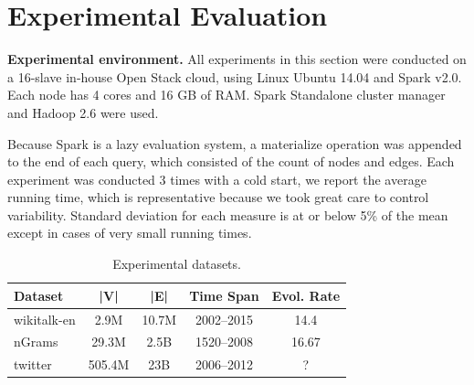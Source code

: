 \section{Experimental Evaluation}
\label{sec:exp}

{\bf Experimental environment.} All experiments in this section were
conducted on a 16-slave in-house Open Stack cloud, using Linux Ubuntu
14.04 and Spark v2.0.  Each node has 4 cores and 16 GB of RAM.  Spark
Standalone cluster manager and Hadoop 2.6 were used.

Because Spark is a lazy evaluation system, a materialize operation was
appended to the end of each query, which consisted of the count of
nodes and edges.  Each experiment was conducted 3 times with a cold
start, we report the average running time, which is representative
because we took great care to control variability.  Standard deviation
for each measure is at or below 5\% of the mean except in cases of
very small running times.

\begin{table}
\caption{Experimental datasets.}
\small
\begin{tabular}{l | c | c | c | c }
\hline
\multicolumn{1}{l|}{\bfseries Dataset} & \multicolumn{1}{c|}{\bfseries |V|} & \multicolumn{1}{c|}{\bfseries |E|} & \multicolumn{1}{c|}{\bfseries Time Span} & \multicolumn{1}{c}{\bfseries Evol. Rate} \\ \hline
wikitalk-en & 2.9M & 10.7M & 2002--2015 & 14.4 \\ \hline
nGrams & 29.3M & 2.5B & 1520--2008 & 16.67 \\ \hline
twitter & 505.4M & 23B & 2006--2012 & ? \\ \hline
\end{tabular}
\label{tab:datasets}
\end{table}

